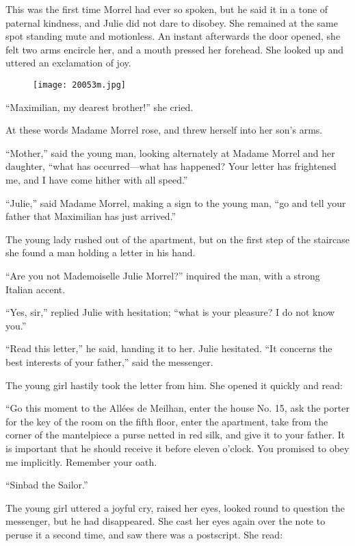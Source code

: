 This was the first time Morrel had ever so spoken, but he said it in a
tone of paternal kindness, and Julie did not dare to disobey. She
remained at the same spot standing mute and motionless. An instant
afterwards the door opened, she felt two arms encircle her, and a mouth
pressed her forehead. She looked up and uttered an exclamation of joy.

\begin{figure}[ht]
\texttt{[image: 20053m.jpg]}
\end{figure}

“Maximilian, my dearest brother!” she cried.

At these words Madame Morrel rose, and threw herself into her son’s
arms.

“Mother,” said the young man, looking alternately at Madame Morrel and
her daughter, “what has occurred—what has happened? Your letter has
frightened me, and I have come hither with all speed.”

“Julie,” said Madame Morrel, making a sign to the young man, “go and
tell your father that Maximilian has just arrived.”

The young lady rushed out of the apartment, but on the first step of
the staircase she found a man holding a letter in his hand.

“Are you not Mademoiselle Julie Morrel?” inquired the man, with a
strong Italian accent.

“Yes, sir,” replied Julie with hesitation; “what is your pleasure? I do
not know you.”

“Read this letter,” he said, handing it to her. Julie hesitated. “It
concerns the best interests of your father,” said the messenger.

The young girl hastily took the letter from him. She opened it quickly
and read:

“Go this moment to the Allées de Meilhan, enter the house No. 15, ask
the porter for the key of the room on the fifth floor, enter the
apartment, take from the corner of the mantelpiece a purse netted in
red silk, and give it to your father. It is important that he should
receive it before eleven o’clock. You promised to obey me implicitly.
Remember your oath.

“Sinbad the Sailor.”

The young girl uttered a joyful cry, raised her eyes, looked round to
question the messenger, but he had disappeared. She cast her eyes again
over the note to peruse it a second time, and saw there was a
postscript. She read:

